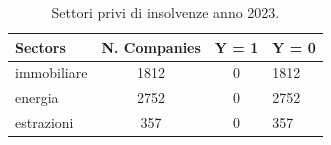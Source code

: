 \begin{table}[H]

\caption{\label{tab:table:sector2023zerodefault}Settori privi di insolvenze anno 2023.}
\centering
\begin{tabular}[t]{lccl}
\toprule
Sectors & N. Companies & Y = 1 & Y = 0\\
\midrule
immobiliare & 1812 & 0 & 1812\\
energia & 2752 & 0 & 2752\\
estrazioni & 357 & 0 & 357\\
\bottomrule
\end{tabular}
\end{table}